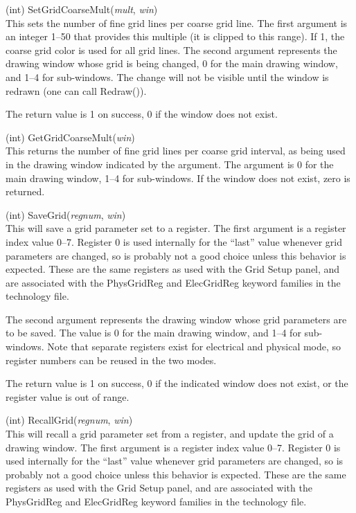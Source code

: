 \begin{description}
\item{(int) \vt SetGridCoarseMult({\it mult\/}, {\it win\/})}\\
This sets the number of fine grid lines per coarse grid line.  The
first argument is an integer 1--50 that provides this multiple (it is
clipped to this range).  If 1, the coarse grid color is used for all
grid lines.  The second argument represents the drawing window whose
grid is being changed, 0 for the main drawing window, and 1--4 for
sub-windows.  The change will not be visible until the window is
redrawn (one can call {\vt Redraw()}).

The return value is 1 on success, 0 if the window does not exist.

\item{(int) \vt GetGridCoarseMult({\it win\/})}\\
This returns the number of fine grid lines per coarse grid interval,
as being used in the drawing window indicated by the argument.  The
argument is 0 for the main drawing window, 1--4 for sub-windows.  If
the window does not exist, zero is returned.

\item{(int) \vt SaveGrid({\it regnum\/}, {\it win\/})}\\
This will save a grid parameter set to a register.  The first argument
is a register index value 0--7.  Register 0 is used internally for the
``last'' value whenever grid parameters are changed, so is probably
not a good choice unless this behavior is expected.  These are the
same registers as used with the {\cb Grid Setup} panel, and are
associated with the {\vt PhysGridReg} and {\vt ElecGridReg} keyword
families in the technology file.

The second argument represents the drawing window whose grid
parameters are to be saved.  The value is 0 for the main drawing
window, and 1--4 for sub-windows.  Note that separate registers exist
for electrical and physical mode, so register numbers can be reused in
the two modes.

The return value is 1 on success, 0 if the indicated window does not
exist, or the register value is out of range.

\item{(int) \vt RecallGrid({\it regnum\/}, {\it win\/})}\\
This will recall a grid parameter set from a register, and update the
grid of a drawing window.  The first argument is a register index
value 0--7.  Register 0 is used internally for the ``last'' value
whenever grid parameters are changed, so is probably not a good choice
unless this behavior is expected.  These are the same registers as
used with the {\cb Grid Setup} panel, and are associated with the {\vt
PhysGridReg} and {\vt ElecGridReg} keyword families in the technology
file.


\end{description}
